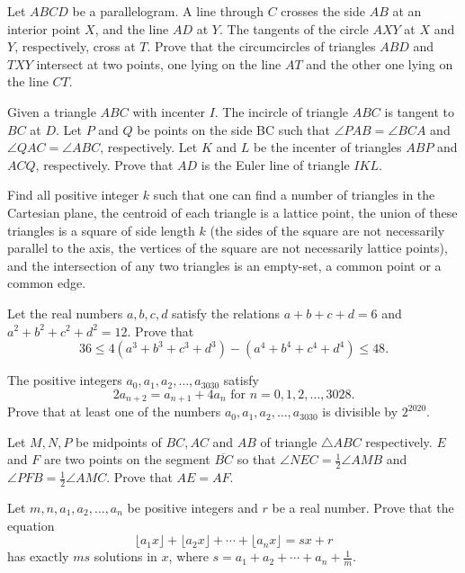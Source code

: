 \documentclass[11pt]{scrartcl}
\begin{document}
\begin{problem}[579228243242060]
Let $ABCD$ be a parallelogram. A line through $C$ crosses the side $AB$ at an interior point $X$,
and the line $AD$ at $Y$. The tangents of the circle $AXY$ at $X$ and $Y$, respectively, cross at $T$.
Prove that the circumcircles of triangles $ABD$ and $TXY$ intersect at two points, one lying on the line $AT$ and the other one lying on the line $CT$.
\end{problem}
\begin{problem}[579345048538257]
	Given a triangle $ABC$ with incenter $I$. The incircle of triangle $ABC$ is tangent to $BC$ at $D$. Let $P$ and $Q$ be points on the side BC such that $\angle PAB = \angle BCA$ and $\angle QAC = \angle ABC$, respectively. Let $K$ and $L$ be the incenter of triangles $ABP$ and $ACQ$, respectively. Prove that $AD$ is the Euler line of triangle $IKL$.
\end{problem}
\begin{problem}[579769332156800]
Find all positive integer $k$ such that one can find a number of triangles in the Cartesian plane, the centroid of each triangle is a lattice point, the union of these triangles is a square of side length $k$ (the sides of the square are not necessarily parallel to the axis, the vertices of the square are not necessarily lattice points), and the intersection of any two triangles is an empty-set, a common point or a common edge.
\end{problem}
\begin{problem}[580405361636802]
Let the real numbers $a,b,c,d$ satisfy the relations $a+b+c+d=6$ and $a^2+b^2+c^2+d^2=12.$ Prove that
\[36 \leq 4 \left(a^3+b^3+c^3+d^3\right) - \left(a^4+b^4+c^4+d^4 \right) \leq 48.\]
\end{problem}
\begin{problem}[583277702191991]
	The positive integers $a_0, a_1, a_2, \ldots, a_{3030}$ satisfy$$2a_{n + 2} = a_{n + 1} + 4a_n \text{ for } n = 0, 1, 2, \ldots, 3028.$$
Prove that at least one of the numbers $a_0, a_1, a_2, \ldots, a_{3030}$ is divisible by $2^{2020}$.
\end{problem}
\begin{problem}[584014589745861]
Let $M,N,P$ be midpoints of $BC,AC$ and $AB$ of triangle $\triangle ABC$ respectively. $E$ and $F$ are two points on the segment $\overline{BC}$ so that $\angle NEC = \frac{1}{2} \angle AMB$ and $\angle PFB = \frac{1}{2} \angle AMC$. Prove that $AE=AF$.
\end{problem}
\begin{problem}[586194373652638]
Let $m,n,a_1,a_2,\dots,a_n$ be positive integers and $r$ be a real number. Prove that the equation
\[\lfloor a_1x\rfloor+\lfloor a_2x\rfloor+\cdots+\lfloor a_nx\rfloor=sx+r\]has exactly $ms$ solutions in $x$, where $s=a_1+a_2+\cdots+a_n+\frac1m$.
\end{problem}
\end{document}
